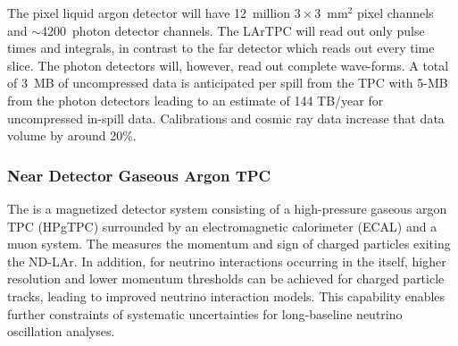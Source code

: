  The pixel liquid argon detector will have 12~million $3\times 3$~mm$^2$ pixel channels and $\sim$4200~photon detector channels.  The LArTPC will read out only pulse times and integrals, in contrast to the far detector which reads out every time slice.  The photon detectors will, however, read out complete wave-forms.   A total of 3~MB of uncompressed data is anticipated per spill from the TPC with 5-MB from the photon detectors leading to an estimate of 144 TB/year for uncompressed in-spill data. Calibrations and cosmic ray data increase that data volume by around 20\%.




\subsubsection{Near Detector Gaseous Argon TPC}
\label{sec:comp-dataestimates-mpd}

The  is a magnetized detector system consisting of a high-pressure gaseous argon TPC  (HPgTPC) surrounded by an electromagnetic calorimeter (ECAL) and a muon system. The  measures the momentum and sign of charged particles exiting the ND-LAr. In addition, for neutrino interactions occurring in the  itself, higher resolution and lower momentum thresholds can be achieved for charged particle tracks, leading to improved neutrino interaction models. This capability enables further constraints of systematic uncertainties for long-baseline neutrino  oscillation analyses.

